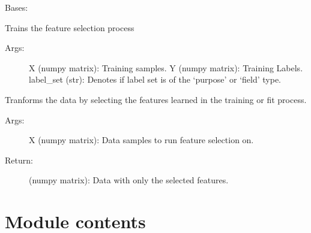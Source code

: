 \documentclass[letterpaper,10pt,english]{sphinxmanual}
\begin{document}
\begin{fulllineitems}
\label{\detokenize{KUHERD:KUHERD.MultiFeatureSelector.MultiFeatureSelector}}
Bases: 

\begin{fulllineitems}
\label{\detokenize{KUHERD:KUHERD.MultiFeatureSelector.MultiFeatureSelector.fit}}
Trains the feature selection process
\begin{description}
\item[{Args:}] \leavevmode
X (numpy matrix): Training samples.
Y (numpy matrix): Training Labels.
label\_set (str): Denotes if label set is of the `purpose' or `field' type.

\end{description}

\end{fulllineitems}


\begin{fulllineitems}
\label{\detokenize{KUHERD:KUHERD.MultiFeatureSelector.MultiFeatureSelector.transform}}
Tranforms the data by selecting the features learned in the training or \sphinxquotedblleft{}fit\sphinxquotedblright{} process.
\begin{description}
\item[{Args:}] \leavevmode
X (numpy matrix): Data samples to run feature selection on.

\item[{Return:}] \leavevmode
(numpy matrix): Data with only the selected features.

\end{description}

\end{fulllineitems}


\end{fulllineitems}



\section{Module contents}
\label{\detokenize{KUHERD:module-contents}}\label{\detokenize{KUHERD:module-KUHERD}}
\end{document}
